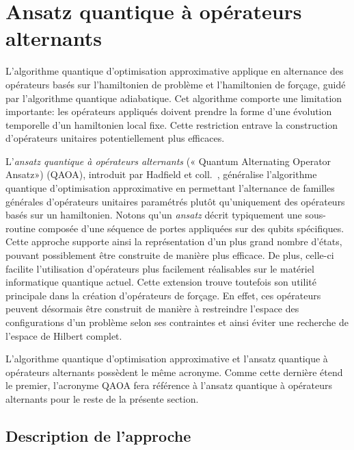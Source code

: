 
\section{Ansatz quantique à opérateurs alternants}
\label{sec:ansatz-quantique-a-operateurs-alternants}

L'algorithme quantique d'optimisation approximative applique en alternance des opérateurs basés sur l'hamiltonien de problème et l'hamiltonien de forçage, guidé par l'algorithme quantique adiabatique. Cet algorithme comporte une limitation importante: les opérateurs appliqués doivent prendre la forme d'une évolution temporelle d'un hamiltonien local fixe. Cette restriction entrave la construction d'opérateurs unitaires potentiellement plus efficaces.

L'\textit{ansatz quantique à opérateurs alternants} (« Quantum Alternating Operator Ansatz») (QAOA), introduit par Hadfield et coll.~\cite{hadfieldQuantumApproximateOptimization2019}, généralise l'algorithme quantique d'optimisation approximative en permettant l'alternance de familles générales d'opérateurs unitaires paramétrés plutôt qu'uniquement des opérateurs basés sur un hamiltonien. Notons qu'un \textit{ansatz} décrit typiquement une sous-routine composée d'une séquence de portes appliquées sur des qubits spécifiques. Cette approche supporte ainsi la représentation d'un plus grand nombre d'états, pouvant possiblement être construite de manière plus efficace. De plus, celle-ci facilite l'utilisation d'opérateurs plus facilement réalisables sur le matériel informatique quantique actuel. Cette extension trouve toutefois son utilité principale dans la création d'opérateurs de forçage. En effet, ces opérateurs peuvent désormais être construit de manière à restreindre l'espace des configurations d'un problème selon ses contraintes et ainsi éviter une recherche de l'espace de Hilbert complet. 

L'algorithme quantique d'optimisation approximative et l'ansatz quantique à opérateurs alternants possèdent le même acronyme. Comme cette dernière étend le premier, l'acronyme QAOA fera référence à l'ansatz quantique à opérateurs alternants pour le reste de la présente section.


\subsection{Description de l'approche}


